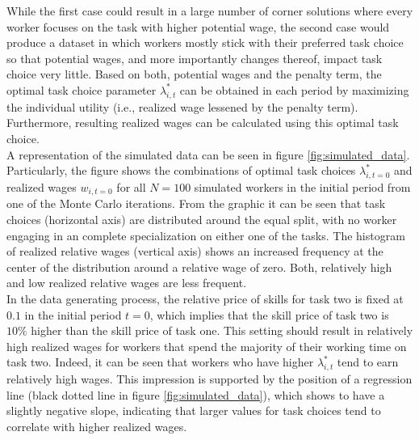 \documentclass[../main.tex]{subfiles}
\begin{document}
While the first case could result in a large number of corner solutions where every worker focuses on the task with higher potential wage, the second case would produce a dataset in which workers mostly stick with their preferred task choice so that potential wages, and more importantly changes thereof, impact task choice very little. Based on both, potential wages and the penalty term, the optimal task choice parameter $\lambda_{i,t}^*$ can be obtained in each period by maximizing the individual utility (i.e., realized wage lessened by the penalty term). Furthermore, resulting realized wages can be calculated using this optimal task choice.
\\
A representation of the simulated data can be seen in figure \ref{fig:simulated_data}. Particularly, the figure shows the combinations of optimal task choices $\lambda_{i,t=0}^*$ and realized wages $w_{i,t=0}$ for all $N=100$ simulated workers in the initial period from one of the Monte Carlo iterations. From the graphic it can be seen that task choices (horizontal axis) are distributed around the equal split, with no worker engaging in an complete specialization on either one of the tasks. The histogram of realized relative wages (vertical axis) shows an increased frequency at the center of the distribution around a relative wage of zero. Both, relatively high and low realized relative wages are less frequent.
\\
In the data generating process, the relative price of skills for task two is fixed at $0.1$ in the initial period $t=0$, which implies that the skill price of task two is $10 \%$ higher than the skill price of task one. This setting should result in relatively high realized wages for workers that spend the majority of their working time on task two. Indeed, it can be seen that workers who have higher $\lambda_{i,t}^*$ tend to earn relatively high wages. This impression is supported by the position of a regression line (black dotted line in figure \ref{fig:simulated_data}), which shows to have a slightly negative slope, indicating that larger values for task choices tend to correlate with higher realized wages.
\end{document}
